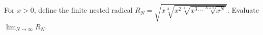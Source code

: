 For $x>0$, define the finite nested radical $R_N=\sqrt{x\sqrt[3]{x^2\sqrt[4]{x^3\cdots\sqrt[N+1]{x^N}}}}$. Evaluate $\lim_{N\to\infty}R_N$.
